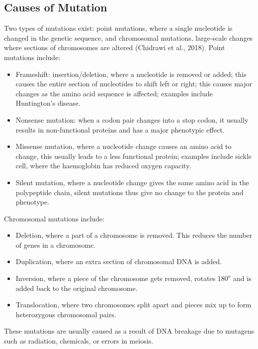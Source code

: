 \documentclass{mva_style}
\begin{document}
\subsection{Causes of Mutation}

Two types of mutations exist: point mutations, where a single nucleotide is changed in the genetic sequence, and chromosomal mutations, large-scale changes where sections of chromosomes are altered (Chidrawi et al., 2018).  
Point mutations include:
\begin{itemize}
    \item Frameshift: insertion/deletion, where a nucleotide is removed or added; this causes the entire section of nucleotides to shift left or right; this causes major changes as the amino acid sequence is affected; examples include Huntington's disease.
    \item Nonsense mutation: when a codon pair changes into a stop codon, it usually results in non-functional proteins and has a major phenotypic effect.
    \item Missense mutation, where a nucleotide change causes an amino acid to change, this usually leads to a less functional protein; examples include sickle cell, where the haemoglobin has reduced oxygen capacity.
    \item Silent mutation, where a nucleotide change gives the same amino acid in the polypeptide chain, silent mutations thus give no change to the protein and phenotype.
\end{itemize}

Chromosomal mutations include:
\begin{itemize}
    \item Deletion, where a part of a chromosome is removed. This reduces the number of genes in a chromosome.
    \item Duplication, where an extra section of chromosomal DNA is added.
    \item Inversion, where a piece of the chromosome gets removed, rotates \begin{math}180^o\end{math} and is added back to the original chromosome.
    \item Translocation, where two chromosomes split apart and pieces mix up to form heterozygous chromosomal pairs.
\end{itemize}

These mutations are usually caused as a result of DNA breakage due to mutagens such as radiation, chemicals, or errors in meiosis.
\end{document}
